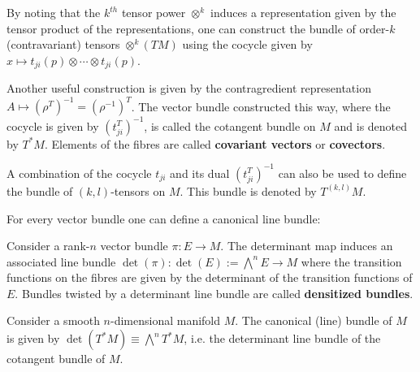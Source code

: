     \begin{example}
        By noting that the $k^{th}$ tensor power $\otimes^k$ induces a representation given by the tensor product of the representations, one can construct the bundle of order-$k$ (contravariant) tensors $\otimes^k(TM)$ using the cocycle given by $x\mapsto t_{ji}(p)\otimes\cdots\otimes t_{ji}(p)$.
    \end{example}
    \begin{example}\label{diff:cotangent_bundle}
        Another useful construction is given by the contragredient representation $A\mapsto (\rho^T)^{-1}=(\rho^{-1})^T$. The vector bundle constructed this way, where the cocycle is given by $(t_{ji}^T)^{-1}$, is called the cotangent bundle on $M$ and is denoted by $T^*M$. Elements of the fibres are called \textbf{covariant vectors} or \textbf{covectors}.
    \end{example}
    \begin{notation}
        A combination of the cocycle $t_{ji}$ and its dual $(t_{ji}^T)^{-1}$ can also be used to define the bundle of $(k,l)$-tensors on $M$. This bundle is denoted by $T^{(k,l)}M$.
    \end{notation}


    For every vector bundle one can define a canonical line bundle:
    \begin{construct}
        Consider a rank-$n$ vector bundle $\pi:E\rightarrow M$. The determinant map induces an associated line bundle $\det(\pi):\det(E):=\bigwedge^nE\rightarrow M$ where the transition functions on the fibres are given by the determinant of the transition functions of $E$. Bundles twisted by a determinant line bundle are called \textbf{densitized bundles}.
    \end{construct}
    \begin{example}\label{diff:canonical_bundle}
        Consider a smooth $n$-dimensional manifold $M$. The canonical (line) bundle of $M$ is given by $\det(T^*M)\equiv\bigwedge^nT^*M$, i.e. the determinant line bundle of the cotangent bundle of $M$.
    \end{example}

